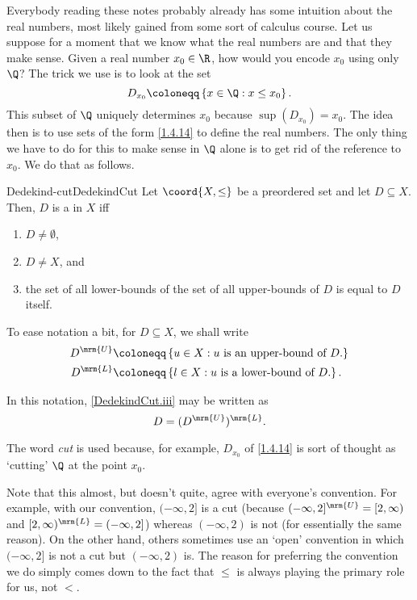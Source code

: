 Everybody reading these notes probably already has some intuition about the real numbers, most likely gained from some sort of calculus course.  Let us suppose for a moment that we know what the real numbers are and that they make sense.  Given a real number $x_0\in \R$, how would you encode $x_0$ using only $\Q$?  The trick we use is to look at the set
\begin{equation}\label{1.4.14}
D_{x_0}\coloneqq \left\{ x\in \Q :x\leq x_0\right\} .
\end{equation}
This subset of $\Q$ uniquely determines $x_0$ because $\sup (D_{x_0})=x_0$.  The idea then is to use sets of the form \eqref{1.4.14} to define the real numbers.  The only thing we have to do for this to make sense in $\Q$ alone is to get rid of the reference to $x_0$.  We do that as follows.
\begin{dfn}{Dedekind-cut}{DedekindCut}
Let $\coord{X,\leq}$ be a preordered set and let $D\subseteq X$.  Then, $D$ is a  in $X$ iff
\begin{enumerate}
\item \label{DedekindCut.i}$D\neq \emptyset$, 
\item \label{DedekindCut.ii}$D\neq X$, and
\item \label{DedekindCut.iii}the set of all lower-bounds of the set of all upper-bounds of $D$ is equal to $D$ itself.
\end{enumerate}
\begin{rmk}
To ease notation a bit, for $D\subseteq X$, we shall write
\intomargin
\begin{equation}
\begin{aligned}
D^{\mrm{U}} & \coloneqq \left\{ u\in X:u\text{ is an upper-bound of }D\text{.}\right\} \\
D^{\mrm{L}} & \coloneqq \left\{ l\in X:u\text{ is a lower-bound of }D\text{.}\right\} .
\end{aligned}
\end{equation}
\end{rmk}
In this notation, \eqref{DedekindCut.iii} may be written as
\begin{equation}
D=(D^{\mrm{U}})^{\mrm{L}}.
\end{equation}
\begin{rmk}
The word \emph{cut} is used because, for example, $D_{x_0}$ of \eqref{1.4.14} is sort of thought as `cutting' $\Q$ at the point $x_0$.
\end{rmk}
\begin{rmk}
Note that this almost, but doesn't quite, agree with everyone's convention.  For example, with our convention, $(-\infty ,2]$ is a cut (because $(-\infty ,2]^{\mrm{U}}=[2,\infty )$ and $[2,\infty )^{\mrm{L}}=(-\infty ,2]$) whereas $(-\infty ,2)$ is not (for essentially the same reason).  On the other hand, others sometimes use an `open' convention in which $(-\infty ,2]$ is not a cut but $(-\infty ,2)$ is.  The reason for preferring the convention we do simply comes down to the fact that $\leq$ is always playing the primary role for us, not $<$.
\end{rmk}
\end{dfn}
